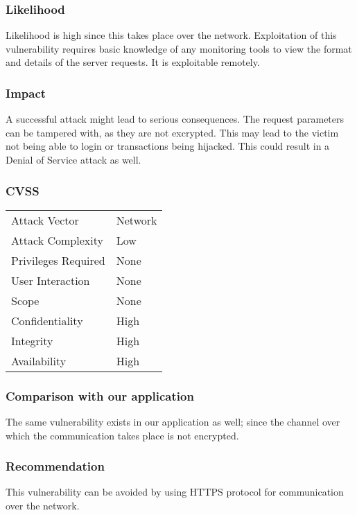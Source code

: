 \subsubsection{Likelihood}
Likelihood is high since this takes place over the network.
Exploitation of this vulnerability requires basic knowledge of any monitoring tools to view the format and details of the server requests. It is exploitable remotely.

\subsubsection{Impact}
A successful attack might lead to serious consequences. The request parameters can be tampered with, as they are not excrypted. This may lead to the victim not being able to login  or transactions being hijacked. This could result in a Denial of Service attack as well.

\subsubsection{CVSS}
\begin{tabular}{l | l}
Attack Vector		& Network \\
Attack Complexity	& Low \\
Privileges Required & None \\
User Interaction	& None \\
Scope				& None \\
Confidentiality		& High \\
Integrity			& High \\
Availability		& High
\end{tabular}

\subsubsection{Comparison with our application}
The same vulnerability exists in our application as well; since the channel over which the communication takes place is not encrypted.

\subsubsection{Recommendation}
This vulnerability can be avoided by using HTTPS protocol for communication over the network.
\clearpage